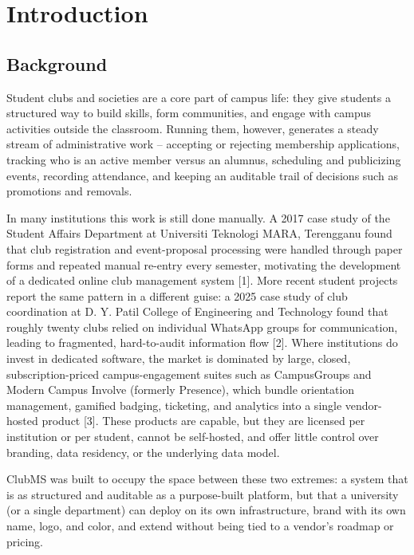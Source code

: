 \documentclass[12pt,oneside]{book}
\begin{document}
\chapter{Introduction}

\section{Background}

Student clubs and societies are a core part of campus life: they give students a structured way to build skills, form communities, and engage with campus activities outside the classroom. Running them, however, generates a steady stream of administrative work -- accepting or rejecting membership applications, tracking who is an active member versus an alumnus, scheduling and publicizing events, recording attendance, and keeping an auditable trail of decisions such as promotions and removals.

In many institutions this work is still done manually. A 2017 case study of the Student Affairs Department at Universiti Teknologi MARA, Terengganu found that club registration and event-proposal processing were handled through paper forms and repeated manual re-entry every semester, motivating the development of a dedicated online club management system [1]. More recent student projects report the same pattern in a different guise: a 2025 case study of club coordination at D. Y. Patil College of Engineering and Technology found that roughly twenty clubs relied on individual WhatsApp groups for communication, leading to fragmented, hard-to-audit information flow [2]. Where institutions do invest in dedicated software, the market is dominated by large, closed, subscription-priced campus-engagement suites such as CampusGroups and Modern Campus Involve (formerly Presence), which bundle orientation management, gamified badging, ticketing, and analytics into a single vendor-hosted product [3]. These products are capable, but they are licensed per institution or per student, cannot be self-hosted, and offer little control over branding, data residency, or the underlying data model.

ClubMS was built to occupy the space between these two extremes: a system that is as structured and auditable as a purpose-built platform, but that a university (or a single department) can deploy on its own infrastructure, brand with its own name, logo, and color, and extend without being tied to a vendor's roadmap or pricing.
\end{document}
